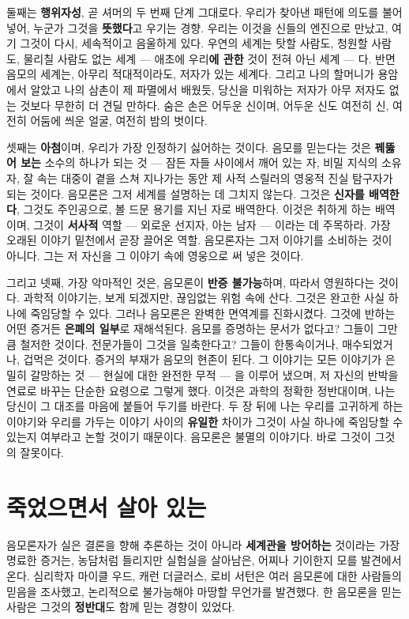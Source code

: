 둘째는 \textbf{행위자성}, 곧 셔머의 두 번째 단계 그대로다. 우리가 찾아낸 패턴에 의도를 불어넣어, 누군가 그것을 \textbf{뜻했다}고 우기는 경향. 우리는 이것을 신들의 엔진으로 만났고, 여기 그것이 다시, 세속적이고 음울하게 있다. 우연의 세계는 탓할 사람도, 청원할 사람도, 물리칠 사람도 없는 세계 — 애초에 우리\textbf{에 관한} 것이 전혀 아닌 세계 — 다. 반면 음모의 세계는, 아무리 적대적이라도, 저자가 있는 세계다. 그리고 나의 할머니가 용암에서 알았고 나의 삼촌이 제 파멸에서 배웠듯, 당신을 미워하는 저자가 아무 저자도 없는 것보다 무한히 더 견딜 만하다. 숨은 손은 어두운 신이며, 어두운 신도 여전히 신, 여전히 어둠에 씌운 얼굴, 여전히 밤의 벗이다.

셋째는 \textbf{아첨}이며, 우리가 가장 인정하기 싫어하는 것이다. 음모를 믿는다는 것은 \textbf{꿰뚫어 보는} 소수의 하나가 되는 것 — 잠든 자들 사이에서 깨어 있는 자, 비밀 지식의 소유자, 잘 속는 대중이 곁을 스쳐 지나가는 동안 제 사적 스릴러의 영웅적 진실 탐구자가 되는 것이다. 음모론은 그저 세계를 설명하는 데 그치지 않는다. 그것은 \textbf{신자를 배역한다}, 그것도 주인공으로, 볼 드문 용기를 지닌 자로 배역한다. 이것은 취하게 하는 배역이며, 그것이 \textbf{서사적} 역할 — 외로운 선지자, 아는 남자 — 이라는 데 주목하라. 가장 오래된 이야기 밑천에서 곧장 끌어온 역할. 음모론자는 그저 이야기를 소비하는 것이 아니다. 그는 저 자신을 그 이야기 속에 영웅으로 써 넣은 것이다.

그리고 넷째, 가장 악마적인 것은, 음모론이 \textbf{반증 불가능}하며, 따라서 영원하다는 것이다. 과학적 이야기는, 보게 되겠지만, 끊임없는 위험 속에 산다. 그것은 완고한 사실 하나에 죽임당할 수 있다. 그러나 음모론은 완벽한 면역계를 진화시켰다. 그것에 반하는 어떤 증거든 \textbf{은폐의 일부}로 재해석된다. 음모를 증명하는 문서가 없다고? 그들이 그만큼 철저한 것이다. 전문가들이 그것을 일축한다고? 그들이 한통속이거나, 매수되었거나, 겁먹은 것이다. 증거의 부재가 음모의 현존이 된다. 그 이야기는 모든 이야기가 은밀히 갈망하는 것 — 현실에 대한 완전한 무적 — 을 이루어 냈으며, 저 자신의 반박을 연료로 바꾸는 단순한 요령으로 그렇게 했다. 이것은 과학의 정확한 정반대이며, 나는 당신이 그 대조를 마음에 붙들어 두기를 바란다. 두 장 뒤에 나는 우리를 고귀하게 하는 이야기와 우리를 가두는 이야기 사이의 \textbf{유일한} 차이가 그것이 사실 하나에 죽임당할 수 있는지 여부라고 논할 것이기 때문이다. 음모론은 불멸의 이야기다. 바로 그것이 그것의 잘못이다.

\section*{죽었으면서 살아 있는}

음모론자가 실은 결론을 향해 추론하는 것이 아니라 \textbf{세계관을 방어하는} 것이라는 가장 명료한 증거는, 농담처럼 들리지만 실험실을 살아남은, 어찌나 기이한지 모를 발견에서 온다. 심리학자 마이클 우드, 캐런 더글러스, 로비 서턴은 여러 음모론에 대한 사람들의 믿음을 조사했고, 논리적으로 불가능해야 마땅할 무언가를 발견했다. 한 음모론을 믿는 사람은 그것의 \textbf{정반대}도 함께 믿는 경향이 있었다.

